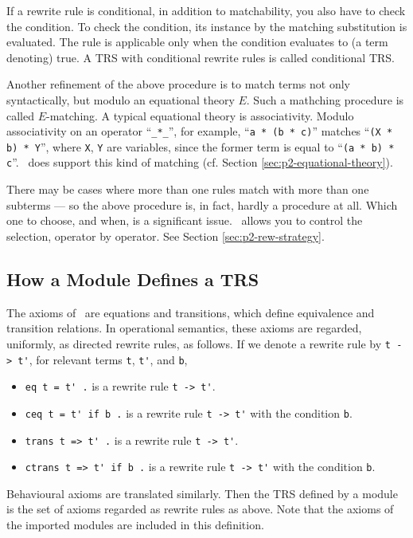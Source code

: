 \documentclass[a4paper]{memoir}
\begin{document}
If a rewrite rule is conditional, in addition to matchability,
you also have to check the condition. To check the condition,
its instance by the matching substitution is evaluated. The rule is
applicable only when the condition evaluates to (a term denoting)
true. A TRS with conditional rewrite rules is called conditional
TRS.

Another refinement of the above procedure is to match terms
not only syntactically, but modulo an equational theory $E$.
Such a mathching procedure is called $E$-matching.
A typical equational theory is associativity. Modulo associativity
on an operator ``\verb|_*_|'', for example,
``\verb|a * (b * c)|'' matches ``\verb|(X * b) * Y|'',
where \verb|X|, \verb|Y| are variables, since the former term is
equal to ``\verb|(a * b) * c|''. \cafeobj~does support this kind of
matching (cf. Section \ref{sec:p2-equational-theory}).

There may be cases where more than one rules match with
more than one subterms --- so the above procedure
is, in fact, hardly a procedure at all. Which one to choose, and when, is a
significant issue. \cafeobj~allows you to control the selection, operator
by operator. See Section \ref{sec:p2-rew-strategy}.

\subsection{How a Module Defines a TRS}\label{sec:p2-executable-module}

The axioms of \cafeobj~are equations and transitions, which define
equivalence and transition relations. In operational semantics,
these axioms are regarded, uniformly, as directed rewrite rules,
as follows. If we denote a rewrite rule by \verb|t -> t'|,
for relevant terms \verb|t|, \verb|t'|, and \verb|b|,
\begin{itemize}
\item[] \verb|eq t = t' .| is a rewrite rule \verb|t -> t'|.
\item[] \verb|ceq t = t' if b .| is a rewrite rule \verb|t -> t'|
  with the condition \verb|b|.
\item[] \verb|trans t => t' .| is a rewrite rule \verb|t -> t'|.
\item[] \verb|ctrans t => t' if b .| is a rewrite rule \verb|t -> t'|
  with the condition \verb|b|.
\end{itemize}
Behavioural axioms are translated similarly.
Then the TRS defined by a module is the set of axioms regarded
as rewrite rules as above. Note that the axioms of the imported
modules are included in this definition.
\end{document}
